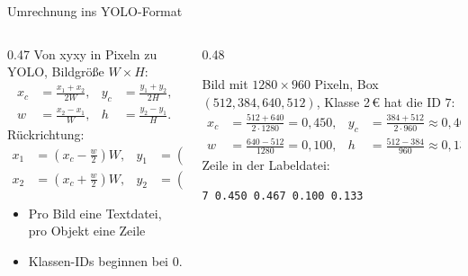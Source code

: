 \begin{frame}{Umrechnung ins YOLO-Format}
\footnotesize
{}
\begin{columns}
\begin{column}{0.47\textwidth}
Von xyxy in Pixeln zu YOLO, Bildgröße $W \times H$:
\begin{align*}
x_c &= \frac{x_1 + x_2}{2W}, & y_c &= \frac{y_1 + y_2}{2H}, \\[2pt]
w   &= \frac{x_2 - x_1}{W},  & h   &= \frac{y_2 - y_1}{H}.
\end{align*}
Rückrichtung:
\begin{align*}
x_1 &= \left(x_c - \tfrac{w}{2}\right) W, & y_1 &= \left(y_c - \tfrac{h}{2}\right) H, \\[2pt]
x_2 &= \left(x_c + \tfrac{w}{2}\right) W, & y_2 &= \left(y_c + \tfrac{h}{2}\right) H.
\end{align*}
\begin{itemize}
  \item Pro Bild eine Textdatei, pro Objekt eine Zeile
  \item Klassen-IDs beginnen bei $0$.
\end{itemize}
\end{column}
\begin{column}{0.48\textwidth}
\begin{beispiel}
Bild mit $1280 \times 960$ Pixeln, Box $(512, 384, 640, 512)$, Klasse 2\,€ hat die ID $7$:
\begin{align*}
x_c &= \tfrac{512 + 640}{2 \cdot 1280} = 0{,}450, & y_c &= \tfrac{384 + 512}{2 \cdot 960} \approx 0{,}467, \\[2pt]
w   &= \tfrac{640 - 512}{1280} = 0{,}100, & h &= \tfrac{512 - 384}{960} \approx 0{,}133.
\end{align*}
Zeile in der Labeldatei:

\centering
\texttt{7 0.450 0.467 0.100 0.133}
\end{beispiel}
\end{column}
\end{columns}
\end{frame}

